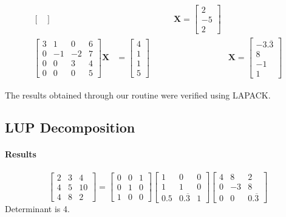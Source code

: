 \documentclass[a4paper,11]{article}
\begin{document}
\[\begin{alignedat}{2}
\begin{bmatrix}
\end{bmatrix} \qquad& &\mathbf{X} = 
\begin{bmatrix} 
	2 \\
	-5 \\
	2
\end{bmatrix}\\
\begin{bmatrix}
	3 & 1 & 0 & 6\\
	0 & -1 & -2 & 7\\
	0 & 0 & 3 & 4\\
	0 & 0 & 0 & 5
\end{bmatrix}\mathbf{X} &= 
\begin{bmatrix} 
	4 \\
	1 \\
	1 \\
	5
\end{bmatrix} \qquad& &\mathbf{X} = 
\begin{bmatrix} 
	-3.\overline{3} \\
	8 \\
	-1 \\
	1
\end{bmatrix}
\end{alignedat}
\]

The results obtained through our routine were verified using LAPACK.

\subsection{LUP Decomposition }

\paragraph{Results}

\[
\begin{bmatrix}
	2 & 3 & 4\\
	4 & 5 & 10\\
	4 & 8 & 2
\end{bmatrix}=
\begin{bmatrix}
	0 & 0 & 1\\
	0 & 1 & 0\\
	1 & 0 & 0
\end{bmatrix}
\begin{bmatrix}
	1 & 0 & 0\\
	1 & 1 & 0\\
	0.5 & 0.\overline{3} & 1
\end{bmatrix}
\begin{bmatrix}
	4 & 8 & 2\\
	0 & -3 & 8\\
	0 & 0 & 0.\overline{3}
\end{bmatrix}
\]
Determinant is 4.
\end{document}
